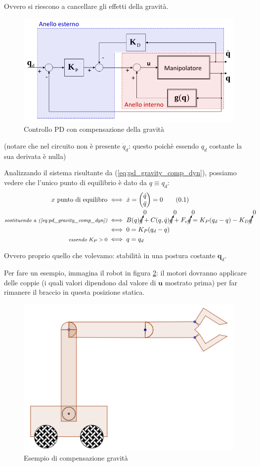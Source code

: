 Ovvero si riescono a cancellare gli effetti della gravità.

\begin{figure}[H]
	\centering
	\includegraphics[width=0.6\linewidth]{images/centralized_control_pd_gravity_comp}
	\caption{Controllo PD con compensazione della gravità}
	\label{fig:centralizedcontrolpdgravitycomp}
\end{figure}
(notare che nel circuito non è presente $\dot{q}_d$: questo poichè essendo $q_d$ costante la sua derivata è nulla)

Analizzando il sistema risultante da (\ref{eq:pd_gravity_comp_dyn}), possiamo vedere che l'unico punto di equilibrio è dato da $q \equiv q_d$:
\unboldmath
\begin{align*}
x \ \text{punto di equilibro} 
&\iff 
\dot{x} = \begin{pmatrix}\dot{q} \\ \ddot{q}\end{pmatrix} = 0
\stepcounter{equation}\tag{\theequation}\label{eq:pd_grav_comp_equil} \\
\textit{\footnotesize{sostituendo a (\ref{eq:pd_gravity_comp_dyn})}}
&\iff 
B(q)\cancelto{0}{\ddot{q}} + C(q, \dot{q})\cancelto{0}{\dot{q}} + F_v\cancelto{0}{\dot{q}} = K_P(q_d - q) - K_D\cancelto{0}{\dot{q}} \\
&\iff
0 = K_P(q_d - q) \\
\textit{\footnotesize{essendo $K_P > 0$}}
&\iff
q = q_d
\end{align*}

Ovvero proprio quello che volevamo: stabilità in una postura costante $\mathbf{q}_d$.

Per fare un esempio, immagina il robot in figura \ref{fig:centralizedcontrolpdgravitycompexample}: il motori dovranno applicare delle coppie (i quali valori dipendono dal valore di $\mathbf{u}$ mostrato prima) per far rimanere il braccio in questa posizione statica.

\begin{figure}[H]
	\centering
	\includegraphics[width=0.5\linewidth]{images/centralized_control_pd_gravity_comp_example}
	\caption{Esempio di compensazione gravità}
	\label{fig:centralizedcontrolpdgravitycompexample}
\end{figure}




